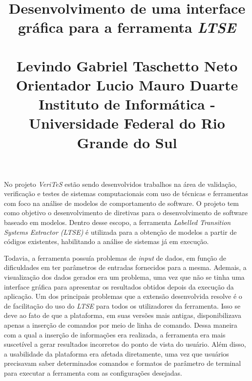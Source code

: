 \documentclass[a4paper,12pt,twoside]{article}
\title{ 
Desenvolvimento de uma interface gráfica para a ferramenta \textit{LTSE} \\ ~ \\
\normalsize Levindo Gabriel Taschetto Neto \\ Orientador Lucio Mauro Duarte\\
\small Instituto de Informática - Universidade Federal do Rio Grande do Sul
}
\date{}
\begin{document}
\maketitle
\vspace{-1.7cm}





No projeto \textit{VeriTeS} estão sendo desenvolvidos trabalhos na área de validação, verificação e testes de sistemas computacionais com uso de técnicas e ferramentas com foco na análise de modelos de comportamento de software.
O projeto tem como objetivo o desenvolvimento de diretivas para o desenvolvimento de software baseado em modelos.
Dentro desse escopo, a ferramenta \textit{Labelled Transition Systems Extractor (LTSE)} é utilizada para a obtenção de modelos a partir de códigos existentes, habilitando a análise de sistemas já em execução.

Todavia, a ferramenta possuía problemas de \textit{input} de dados, em função de dificuldades em ter parâmetros de entradas fornecidos para a mesma.
Ademais, a visualização dos dados gerados era um problema, uma vez que não se tinha uma interface gráfica para apresentar os resultados obtidos depois da execução da aplicação.
Um dos principais problemas que a extensão desenvolvida resolve é o de facilitação do uso do \textit{LTSE} para todos os utilizadores da ferramenta. Isso se deve ao fato de que a plataforma, em suas versões mais antigas, disponibilizava apenas a inserção de comandos por meio de linha de comando.
Dessa maneira com a qual a inserção de informações era realizada, a ferramenta era mais suscetível a gerar resultados incorretos do ponto de vista do usuário.
Além disso, a usabilidade da plataforma era afetada diretamente, uma vez que usuários precisavam saber determinados comandos e formatos de parâmetro de terminal para executar a ferramenta com as configurações desejadas.
\end{document}
